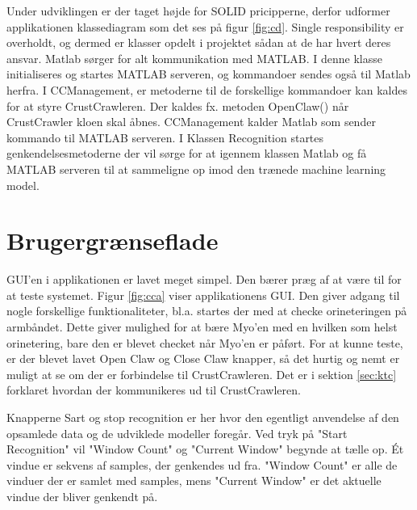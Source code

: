 
Under udviklingen er der taget højde for SOLID pricipperne\citep{RefWorks:10}, derfor udformer applikationen klassediagram som det ses på figur \ref{fig:cd}. Single responsibility\citep{RefWorks:9} er overholdt, og dermed er klasser opdelt i projektet sådan at de har hvert deres ansvar. Matlab sørger for alt kommunikation med MATLAB. I denne klasse initialiseres og startes MATLAB serveren, og kommandoer sendes også til Matlab herfra. I CCManagement, er metoderne til de forskellige kommandoer kan kaldes for at styre CrustCrawleren. Der kaldes fx. metoden OpenClaw() når CrustCrawler kloen skal åbnes. CCManagement kalder Matlab som sender kommando til MATLAB serveren. I Klassen Recognition startes genkendelsesmetoderne der vil sørge for at igennem klassen Matlab og få MATLAB serveren til at sammeligne op imod den trænede machine learning model.



\section{Brugergrænseflade}

GUI'en i applikationen er lavet meget simpel. Den bærer præg af at være til for at teste systemet. Figur \ref{fig:cca} viser applikationens GUI. Den giver adgang til nogle forskellige funktionaliteter, bl.a. startes der med at checke orineteringen på armbåndet. Dette giver mulighed for at bære Myo'en med en hvilken som helst orinetering, bare den er blevet checket når Myo'en er påført. For at kunne teste, er der blevet lavet Open Claw og Close Claw knapper, så det hurtig og nemt er muligt at se om der er forbindelse til CrustCrawleren. Det er i sektion \ref{sec:ktc} forklaret hvordan der kommunikeres ud til CrustCrawleren.

Knapperne Sart og stop recognition er her hvor den egentligt anvendelse af den opsamlede data og de udviklede modeller foregår. Ved tryk på "Start Recognition" vil "Window Count" og "Current Window" begynde at tælle op. Ét vindue er sekvens af samples, der genkendes ud fra. "Window Count" er alle de vinduer der er samlet med samples, mens "Current Window" er det aktuelle vindue der bliver genkendt på.

